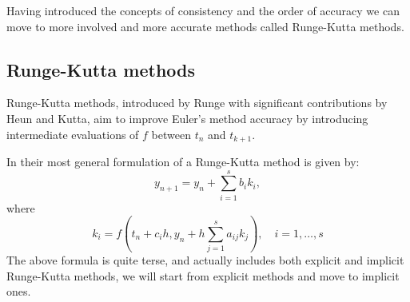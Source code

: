 \documentclass[11pt]{article}
\begin{document}
    Having introduced the concepts of consistency and the order of accuracy we can move to more involved and more
    accurate methods called Runge-Kutta methods.

    \subsection{Runge-Kutta methods}
    Runge-Kutta methods, introduced by Runge with significant contributions by Heun and Kutta, aim to improve Euler's
    method accuracy by introducing intermediate evaluations of $f$ between $t_n$ and $t_{k+1}$.

    In their most general formulation of a Runge-Kutta method is given by:
    \begin{equation}
        \label{eq:sol:rungekutta}
        y_{n+1} =
        y_{n} + \sum_{i=1}^s b_i k_i,
    \end{equation}
    where
    \begin{equation*}
        k_i = f\left(t_n + c_ih, y_n + h\sum_{j=1}^s a_{ij} k_j \right), \quad i=1,\dots,s
    \end{equation*}
    The above formula is quite terse, and actually includes both explicit and implicit Runge-Kutta methods, we will
    start from explicit methods and move to implicit ones.
\end{document}

